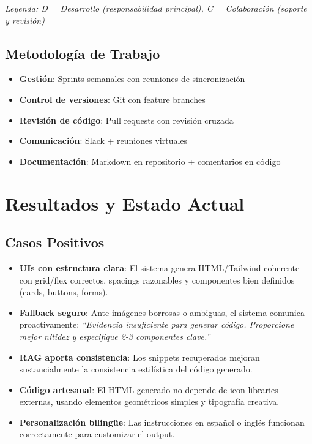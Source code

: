 \documentclass[12pt,a4paper]{article}
\begin{document}
\textit{Leyenda: D = Desarrollo (responsabilidad principal), C = Colaboración (soporte y revisión)}

\subsection{Metodología de Trabajo}

\begin{itemize}
    \item \textbf{Gestión}: Sprints semanales con reuniones de sincronización
    \item \textbf{Control de versiones}: Git con feature branches
    \item \textbf{Revisión de código}: Pull requests con revisión cruzada
    \item \textbf{Comunicación}: Slack + reuniones virtuales
    \item \textbf{Documentación}: Markdown en repositorio + comentarios en código
\end{itemize}

\section{Resultados y Estado Actual}

\subsection{Casos Positivos}

\begin{itemize}
    \item \textbf{UIs con estructura clara}: El sistema genera HTML/Tailwind coherente con grid/flex correctos, spacings razonables y componentes bien definidos (cards, buttons, forms).
    
    \item \textbf{Fallback seguro}: Ante imágenes borrosas o ambiguas, el sistema comunica proactivamente: \textit{``Evidencia insuficiente para generar código. Proporcione mejor nitidez y especifique 2-3 componentes clave.''}
    
    \item \textbf{RAG aporta consistencia}: Los snippets recuperados mejoran sustancialmente la consistencia estilística del código generado.
    
    \item \textbf{Código artesanal}: El HTML generado no depende de icon libraries externas, usando elementos geométricos simples y tipografía creativa.
    
    \item \textbf{Personalización bilingüe}: Las instrucciones en español o inglés funcionan correctamente para customizar el output.
\end{itemize}
\end{document}
